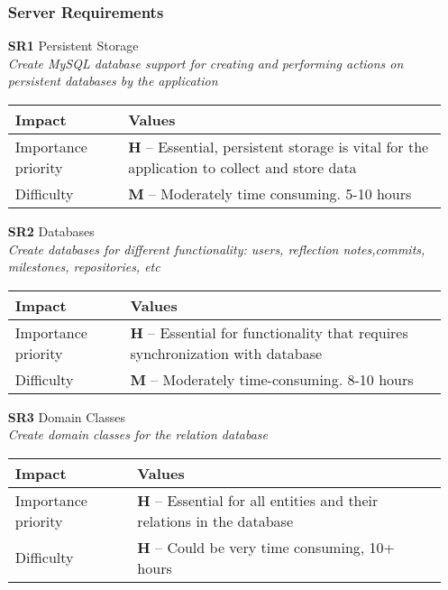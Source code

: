 \begin{itemize}
    \subsubsection{Server Requirements}
    \item[\textbf{SR1}] Persistent Storage\\
        \textit{\small{Create MySQL database support for creating and performing actions on persistent databases by the application}}

        \begin{tabular}{| l | p{7cm} |}
            \hline
            \rowcolor[gray]{0.8}
            \textbf{Impact} & \textbf{Values} \\
            \hline
            Importance priority & \textbf{H} -- Essential, persistent storage is vital for the application to collect and store data\\
            Difficulty & \textbf{M} -- Moderately time consuming. 5-10 hours\\
            \hline
        \end{tabular}
    \vspace{0.5cm}

    \item[\textbf{SR2}] Databases\\
        \textit{\small{Create databases for different functionality: users, reflection notes,commits, milestones, repositories, etc}}

        \begin{tabular}{| l | p{7cm} |}
            \hline
            \rowcolor[gray]{0.8}
            \textbf{Impact} & \textbf{Values} \\
            \hline
            Importance priority & \textbf{H} -- Essential for functionality that requires synchronization with database\\
            Difficulty & \textbf{M} -- Moderately time-consuming. 8-10 hours\\
            \hline
        \end{tabular}
    \vspace{0.5cm}

    \item[\textbf{SR3}] Domain Classes\\
        \textit{\small{Create domain classes for the relation database}}

        \begin{tabular}{| l | p{7cm} |}
            \hline
            \rowcolor[gray]{0.8}
            \textbf{Impact} & \textbf{Values} \\
            \hline
            Importance priority & \textbf{H} -- Essential for all entities and their relations in the database \\
            Difficulty & \textbf{H} -- Could be very time consuming, 10+ hours \\
            \hline
        \end{tabular}
    \vspace{0.5cm}
\end{itemize}